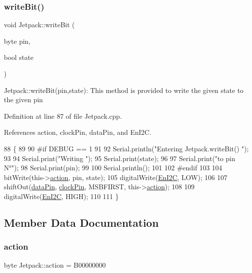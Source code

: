 \subsubsection{\texorpdfstring{write\+Bit()}{writeBit()}}
{\footnotesize\ttfamily void Jetpack\+::write\+Bit (\begin{DoxyParamCaption}\item[{byte}]{pin,  }\item[{bool}]{state }\end{DoxyParamCaption})}

Jetpack\+::write\+Bit(pin,state)\+: This method is provided to write the given state to the given pin 

Definition at line 87 of file Jetpack.\+cpp.



References action, clock\+Pin, data\+Pin, and En\+I2C.


\begin{DoxyCode}
88 \{
89 
90 \textcolor{preprocessor}{#if DEBUG == 1 }
91 
92     Serial.println(\textcolor{stringliteral}{"Entering Jetpack.writeBit() "});
93 
94     Serial.print(\textcolor{stringliteral}{"Writing "});
95     Serial.print(state);
96 
97     Serial.print(\textcolor{stringliteral}{"to pin N°"});
98     Serial.print(pin);
99 
100     Serial.println();
101 
102 \textcolor{preprocessor}{#endif}
103 
104     bitWrite(this->\hyperlink{classJetpack_aca3142925a7b0834b34ae91d26af7765}{action}, pin, state);
105     digitalWrite(\hyperlink{classJetpack_a81df984fb4cea98c71aa1a1cfcdfe814}{EnI2C}, LOW);
106     
107     shiftOut(\hyperlink{classJetpack_a3d669a56e93c71dd25f970d4ed7d0c00}{dataPin}, \hyperlink{classJetpack_a58ebb991f358f3ae94e82148b0221b5a}{clockPin}, MSBFIRST, this->\hyperlink{classJetpack_aca3142925a7b0834b34ae91d26af7765}{action});
108 
109     digitalWrite(\hyperlink{classJetpack_a81df984fb4cea98c71aa1a1cfcdfe814}{EnI2C}, HIGH);
110 
111 \}
\end{DoxyCode}


\subsection{Member Data Documentation}
\mbox{\label{classJetpack_aca3142925a7b0834b34ae91d26af7765}} 
\subsubsection{\texorpdfstring{action}{action}}
{\footnotesize\ttfamily byte Jetpack\+::action = B00000000\hspace{0.3cm}{\ttfamily [private]}}



